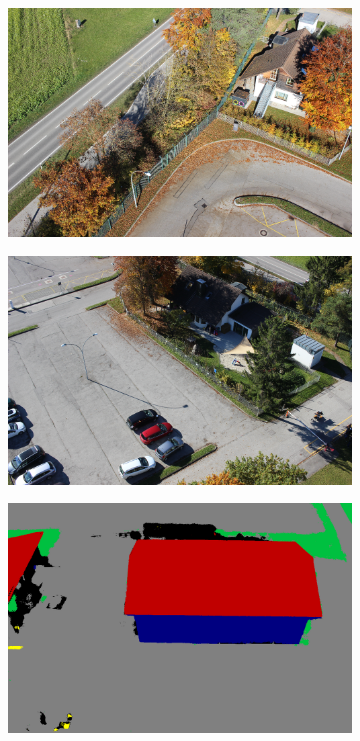 \documentclass[remotesensing,article,accept,moreauthors,pdftex,10pt,a4paper]{mdpi}
\theoremstyle{mdpi}
\newcounter{ex}
\newcounter{re}
\begin{document}
\begin{figure}[H]
\begin{subfigure}[tbp]{0.24\columnwidth}
           \includegraphics[width=\textwidth]{segment/kiga_ori1.png}
           \caption[]{}
           {{\small }}
           \label{fig:4c}
       \end{subfigure}       
       \begin{subfigure}[tbp]{0.24\columnwidth}
           \centering
           \includegraphics[width=\textwidth]{segment/kiga_ori2.png}
           \caption[]{}%
           {{\small }}
           \label{fig:4d}
       \end{subfigure}
       \hfill       
       \begin{subfigure}[tbp]{0.24\columnwidth}  
           \centering 
           \includegraphics[width=\textwidth]{segment/fin_seg1.png}

\end{subfigure}
\end{figure}
\end{document}
